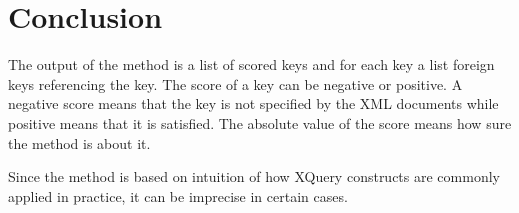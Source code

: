 \section{Conclusion}
The output of the method is a list of scored keys and for each key a list foreign keys referencing the key. The score of a key can be negative or positive. A negative score means that the key is not specified by the XML documents while positive means that it is satisfied. The absolute value of the score means how sure the method is about it.

Since the method is based on intuition of how XQuery constructs are commonly applied in practice, it can be imprecise in certain cases.

